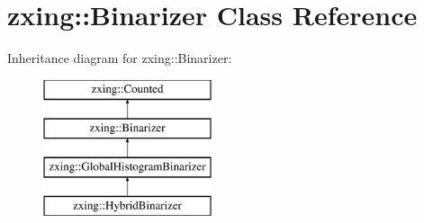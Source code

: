 \hypertarget{classzxing_1_1_binarizer}{}\section{zxing\+:\+:Binarizer Class Reference}
\label{classzxing_1_1_binarizer}
Inheritance diagram for zxing\+:\+:Binarizer\+:\begin{figure}[H]
\begin{center}
\leavevmode
\includegraphics[height=4.000000cm]{classzxing_1_1_binarizer}
\end{center}
\end{figure}
